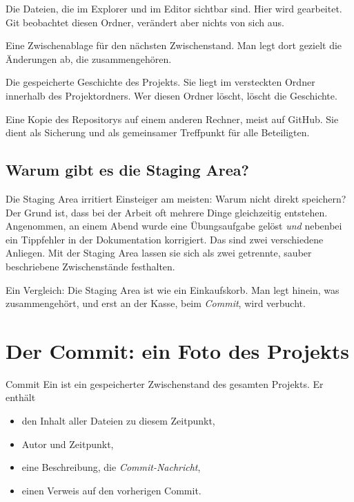 \begin{description}[style=nextline, leftmargin=1.2cm]
  \item[1. Arbeitsordner \normalfont(\emph{working tree})]
    Die Dateien, die im Explorer und im Editor sichtbar sind. Hier wird gearbeitet. Git
    beobachtet diesen Ordner, verändert aber nichts von sich aus.
  \item[2. Staging Area \normalfont(Vormerkung, auch \emph{index})]
    Eine Zwischenablage für den nächsten Zwischenstand. Man legt dort gezielt die
    Änderungen ab, die zusammengehören.
  \item[3. Lokales Repository \normalfont(\emph{repository}, kurz \emph{Repo})]
    Die gespeicherte Geschichte des Projekts. Sie liegt im versteckten Ordner 
    innerhalb des Projektordners. Wer diesen Ordner löscht, löscht die Geschichte.
  \item[4. Remote \normalfont(entfernte Kopie)]
    Eine Kopie des Repositorys auf einem anderen Rechner, meist auf GitHub. Sie dient als
    Sicherung und als gemeinsamer Treffpunkt für alle Beteiligten.
\end{description}

\subsection*{Warum gibt es die Staging Area?}

Die Staging Area irritiert Einsteiger am meisten: Warum nicht direkt speichern? Der Grund
ist, dass bei der Arbeit oft mehrere Dinge gleichzeitig entstehen. Angenommen, an einem
Abend wurde eine Übungsaufgabe gelöst \emph{und} nebenbei ein Tippfehler in der
Dokumentation korrigiert. Das sind zwei verschiedene Anliegen. Mit der Staging Area lassen
sie sich als zwei getrennte, sauber beschriebene Zwischenstände festhalten.

Ein Vergleich: Die Staging Area ist wie ein Einkaufskorb. Man legt hinein, was zusammengehört,
und erst an der Kasse, beim \emph{Commit}, wird verbucht.

\section{Der Commit: ein Foto des Projekts}

\begin{definition}{Commit}
Ein  ist ein gespeicherter Zwischenstand des gesamten Projekts. Er enthält
\begin{itemize}[nosep]
  \item den Inhalt aller Dateien zu diesem Zeitpunkt,
  \item Autor und Zeitpunkt,
  \item eine Beschreibung, die \emph{Commit-Nachricht},
  \item einen Verweis auf den vorherigen Commit.
\end{itemize}
\end{definition}

